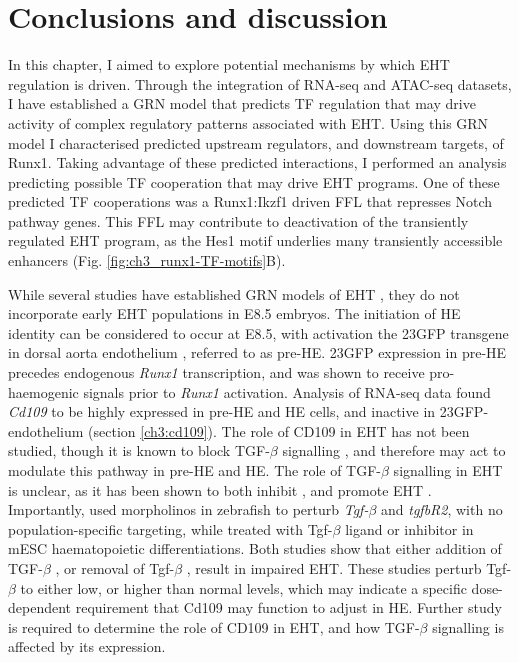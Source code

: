 \clearpage
\section{Conclusions and discussion}

In this chapter, I aimed to explore potential mechanisms by which EHT regulation is driven. Through the integration of RNA-seq and ATAC-seq datasets, I have established a GRN model that predicts TF regulation that may drive activity of complex regulatory patterns associated with EHT. Using this GRN model I characterised predicted upstream regulators, and downstream targets, of Runx1. Taking advantage of these predicted interactions, I performed an analysis predicting possible TF cooperation that may drive EHT programs. One of these predicted TF cooperations was a Runx1:Ikzf1 driven FFL that represses Notch pathway genes. This FFL may contribute to deactivation of the transiently regulated EHT program, as the Hes1 motif underlies many transiently accessible enhancers (Fig. \ref{fig:ch3_runx1-TF-motifs}B).

While several studies have established GRN models of EHT \citep{baron_single-cell_2018, zhu_developmental_2020, zeng_tracing_2019, bergiers_single-cell_2018, gao_transcriptional_2020}, they do not incorporate early EHT populations in E8.5 embryos. The initiation of HE identity can be considered to occur at E8.5, with activation the 23GFP transgene in dorsal aorta endothelium \citep{swiers_early_2013}, referred to as pre-HE. 23GFP expression in pre-HE precedes endogenous \textit{Runx1} transcription, and was shown to receive pro-haemogenic signals prior to \textit{Runx1} activation. Analysis of RNA-seq data found \textit{Cd109} to be highly expressed in pre-HE and HE cells, and inactive in 23GFP- endothelium (section \ref{ch3:cd109}). The role of CD109 in EHT has not been studied, though it is known to block TGF-$\beta$ signalling \citep{mii_cd109_2019}, and therefore may act to modulate this pathway in pre-HE and HE. The role of TGF-$\beta$ signalling in EHT is unclear, as it has been shown to both inhibit \citep{vargel_activation_2016}, and promote EHT \citep{monteiro_transforming_2016}. Importantly, \cite{monteiro_transforming_2016} used morpholinos in zebrafish to perturb \textit{Tgf-$\beta$} and \textit{tgfbR2}, with no population-specific targeting, while \cite{vargel_activation_2016} treated with Tgf-$\beta$ ligand or inhibitor in mESC haematopoietic differentiations. Both studies show that either addition of TGF-$\beta$ \citep{vargel_activation_2016}, or removal of Tgf-$\beta$ \citep{monteiro_transforming_2016}, result in impaired EHT. These studies perturb Tgf-$\beta$ to either low, or higher than normal levels, which may indicate a specific dose-dependent requirement that Cd109 may function to adjust in HE. Further study is required to determine the role of CD109 in EHT, and how TGF-$\beta$ signalling is affected by its expression.

